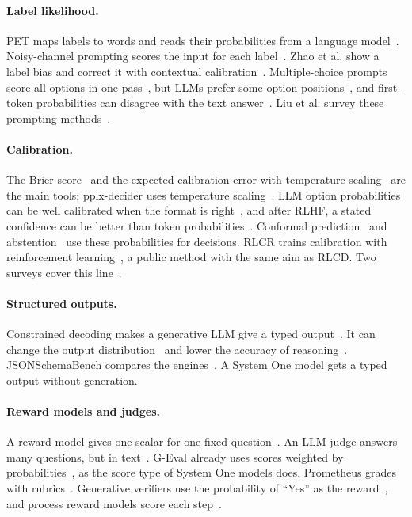 \documentclass[acmsmall,nonacm,screen]{acmart}
\newcommand{\sone}{System One model\xspace}
\newcommand{\sones}{System One models\xspace}
\begin{document}
\paragraph{Label likelihood.} PET maps labels to words and reads their probabilities from a language model~\cite{schick2020exploiting}. Noisy-channel prompting scores the input for each label~\cite{min2021noisy}. Zhao et al. show a label bias and correct it with contextual calibration~\cite{zhao2021calibrate}. Multiple-choice prompts score all options in one pass~\cite{robinson2022leveraging}, but LLMs prefer some option positions~\cite{zheng2023large,pezeshkpour2023large}, and first-token probabilities can disagree with the text answer~\cite{wang2024answer}. Liu et al. survey these prompting methods~\cite{liu2021pretrain}.

\paragraph{Calibration.} The Brier score~\cite{brier1950verification} and the expected calibration error with temperature scaling~\cite{guo2017calibration} are the main tools; pplx-decider uses temperature scaling~\cite{perplexity2026decider}. LLM option probabilities can be well calibrated when the format is right~\cite{kadavath2022language}, and after RLHF, a stated confidence can be better than token probabilities~\cite{tian2023just}. Conformal prediction~\cite{kumar2023conformal} and abstention~\cite{wen2024know} use these probabilities for decisions. RLCR trains calibration with reinforcement learning~\cite{damani2025beyond}, a public method with the same aim as RLCD. Two surveys cover this line~\cite{geng2023survey,liu2025uncertainty}.

\paragraph{Structured outputs.} Constrained decoding makes a generative LLM give a typed output~\cite{willard2023efficient,dong2024xgrammar}. It can change the output distribution~\cite{park2024grammaraligned} and lower the accuracy of reasoning~\cite{tam2024let}. JSONSchemaBench compares the engines~\cite{geng2025jsonschemabench}. A \sone gets a typed output without generation.

\paragraph{Reward models and judges.} A reward model gives one scalar for one fixed question~\cite{lambert2024rewardbench,malik2025rewardbench}. An LLM judge answers many questions, but in text~\cite{zheng2023judging,gu2024survey}. G-Eval already uses scores weighted by probabilities~\cite{liu2023geval}, as the score type of \sones does. Prometheus grades with rubrics~\cite{kim2023prometheus}. Generative verifiers use the probability of ``Yes'' as the reward~\cite{zhang2024generative}, and process reward models score each step~\cite{lightman2023let}.
\end{document}
